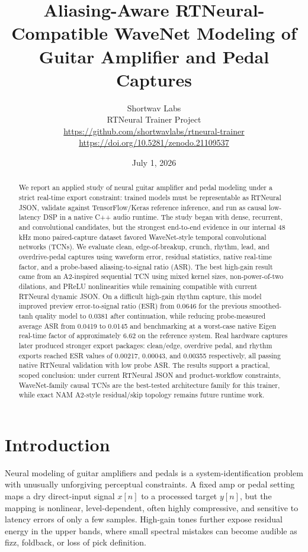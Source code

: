 \documentclass[11pt]{article}
\title{Aliasing-Aware RTNeural-Compatible WaveNet Modeling of Guitar Amplifier and Pedal Captures}
\author{
Shortwav Labs\\
\small RTNeural Trainer Project\\
\small \url{https://github.com/shortwavlabs/rtneural-trainer}\\
\small \url{https://doi.org/10.5281/zenodo.21109537}
}
\date{July 1, 2026}
\begin{document}
\maketitle

\begin{abstract}
We report an applied study of neural guitar amplifier and pedal modeling under
a strict real-time export constraint: trained models must be representable as
RTNeural JSON, validate against TensorFlow/Keras reference inference, and run as
causal low-latency DSP in a native C++ audio runtime. The study began with
dense, recurrent, and convolutional candidates, but the strongest end-to-end
evidence in our internal 48 kHz mono paired-capture dataset favored
WaveNet-style temporal convolutional networks (TCNs). We evaluate clean,
edge-of-breakup, crunch, rhythm, lead, and overdrive-pedal captures using
waveform error, residual statistics, native real-time factor, and a
probe-based aliasing-to-signal ratio (ASR). The best high-gain result came from
an A2-inspired sequential TCN using mixed kernel sizes, non-power-of-two
dilations, and PReLU nonlinearities while remaining compatible with current
RTNeural dynamic JSON. On a difficult high-gain rhythm capture, this model
improved preview error-to-signal ratio (ESR) from 0.0646 for the previous
smoothed-tanh quality model to 0.0381 after continuation, while reducing
probe-measured average ASR from 0.0419 to 0.0145 and benchmarking at a
worst-case native Eigen real-time factor of approximately 6.62 on the
reference system. Real hardware captures later produced stronger export
packages: clean/edge, overdrive pedal, and rhythm exports reached ESR values of
0.00217, 0.00043, and 0.00355 respectively, all passing native RTNeural
validation with low probe ASR. The results support a practical, scoped
conclusion: under current RTNeural JSON and product-workflow constraints,
WaveNet-family causal TCNs are the best-tested architecture family for this
trainer, while exact NAM A2-style residual/skip topology remains future
runtime work.
\end{abstract}

\section{Introduction}

Neural modeling of guitar amplifiers and pedals is a system-identification
problem with unusually unforgiving perceptual constraints. A fixed amp or pedal
setting maps a dry direct-input signal \(x[n]\) to a processed target
\(y[n]\), but the mapping is nonlinear, level-dependent, often highly
compressive, and sensitive to latency errors of only a few samples. High-gain
tones further expose residual energy in the upper bands, where small spectral
mistakes can become audible as fizz, foldback, or loss of pick definition.
\end{document}
